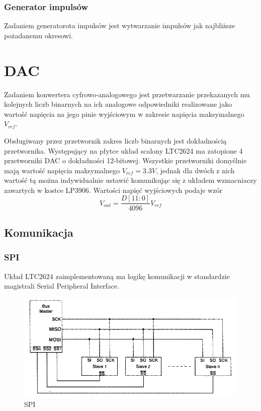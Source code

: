 \documentclass[a4paper,12pt]{article}
\begin{document}
\subsubsection{Generator impulsów}
Zadaniem generatorota impulsów jest wytwarzanie impulsów jak najbliższe pożadanemu okresowi.


\newpage
\section{DAC}
Zadaniem konwertera cyfrowo-analogowego jest przetwarzanie przekazanych mu kolejnych liczb binarnych na ich analogowe odpowiedniki realizowane jako wartość napięcia na jego pinie wyjściowym w zakresie napięcia maksymalnego $V_{ref}$.

Obsługiwany przez przetwornik zakres liczb binarnych jest dokładnością przetwornika. Występujący na płytce układ scalony LTC2624 ma zatopione 4 przetworniki DAC o dokładności 12-bitowej. Wszystkie przetworniki domyślnie mają wartość napięcia maksymalnego $V_{ref} = 3.3V$, jednak dla dwóch z nich wartość tą można indywidualnie ustawić komunikując się z układem wzmacniaczy zawartych w kostce LP3906. Wartości napięć wyjściowych podaje wzór
$$V_{out} = \frac{D[11:0]}{4096}  V_{ref}$$

\subsection{Komunikacja}

\subsubsection{SPI}
Układ LTC2624 zaimplementowaną ma logikę komunikacji w standardzie magistrali Serial Peripheral Interface.

\begin{figure}[htb]
   \centering
   \includegraphics[width=15cm]{grafika/spi.jpg}
   \caption{SPI}
\end{figure}
\end{document}
